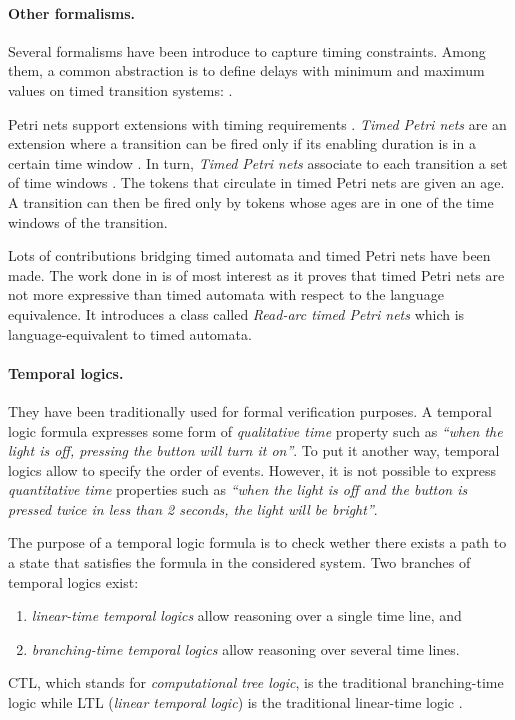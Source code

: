 \paragraph{Other formalisms.}
Several formalisms have been introduce to capture timing constraints. Among them, a common abstraction is to define delays with minimum and maximum values on timed transition systems: \cite{HenzingerMP94,MerrittMT91,LynchA92,PnueliH88}.

Petri nets support extensions with timing requirements \cite{petrinets}. \emph{Timed Petri nets} are an extension where a transition can be fired only if its enabling duration is in a certain time window \cite{PMM74}. In turn, \emph{Timed Petri nets} associate to each transition a set of time windows \cite{Ramchandani74}. The tokens that circulate in timed Petri nets are given an age. A transition can then be fired only by tokens whose ages are in one of the time windows of the transition.

Lots of contributions bridging timed automata and timed Petri nets have been made. The work done in \cite{BHR-ICALP2006} is of most interest as it proves that timed Petri nets are not more expressive than timed automata with respect to the language equivalence. It introduces a class called \emph{Read-arc timed Petri nets} which is language-equivalent to timed automata.

\paragraph{Temporal logics.}
They have been traditionally used for formal verification purposes. A temporal logic formula  expresses some form of \emph{qualitative time} property such as \emph{``when the light is off, pressing the button will turn it on''}. To put it another way, temporal logics allow to specify the order of events. However, it is not possible to express \emph{quantitative time} properties such as \emph{``when the light is off and the button is pressed twice in less than 2 seconds, the light will be bright''}.

The purpose of a temporal logic formula is to check wether there exists a path to a state that satisfies the formula in the considered system. Two branches of temporal logics exist:
\begin{enumerate}
  
  \item \emph{linear-time temporal logics} allow reasoning over a single time line, and
  
  \item \emph{branching-time temporal logics} allow reasoning over several time lines.
  
\end{enumerate}
CTL, which stands for \emph{computational tree logic}, is the traditional branching-time logic \cite{ClarkeES86} while LTL (\emph{linear temporal logic}) is the traditional linear-time logic \cite{Pnueli77}.

